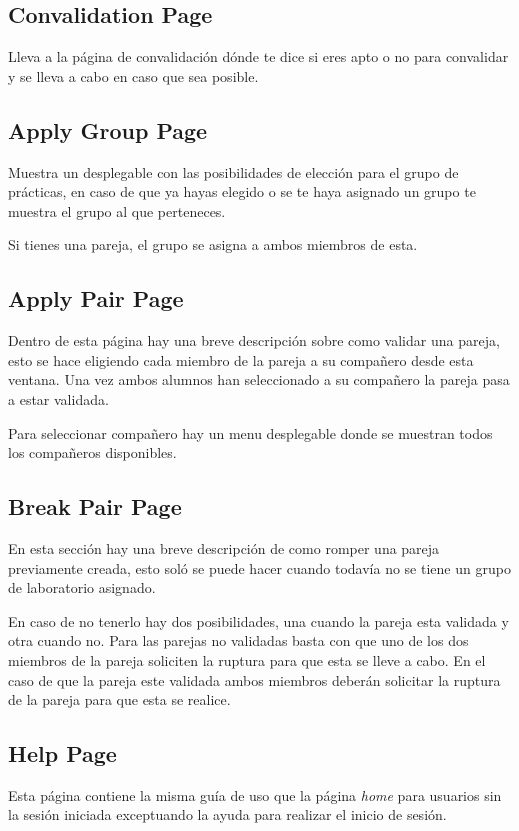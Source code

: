 \documentclass{article}
\begin{document}
\subsection*{Convalidation Page}

Lleva a la página de convalidación dónde te dice si eres apto o no para convalidar y se lleva a cabo en caso
que sea posible.


\subsection*{Apply Group Page}

Muestra un desplegable con las posibilidades de elección para el grupo de prácticas, en caso de que ya hayas
elegido o se te haya asignado un grupo te muestra el grupo al que perteneces.

Si tienes una pareja, el grupo se asigna a ambos miembros de esta.


\subsection*{Apply Pair Page}

Dentro de esta página hay una breve descripción sobre como validar una pareja, esto se hace eligiendo cada miembro
de la pareja a su compañero desde esta ventana. Una vez ambos alumnos han seleccionado a su compañero la pareja pasa 
a estar validada.

Para seleccionar compañero hay un menu desplegable donde se muestran todos los compañeros disponibles.


\subsection*{Break Pair Page}

En esta sección hay una breve descripción de como romper una pareja previamente creada, esto soló se puede
hacer cuando todavía no se tiene un grupo de laboratorio asignado.

En caso de no tenerlo hay dos posibilidades, una cuando la pareja esta validada y otra cuando no. Para las parejas
no validadas basta con que uno de los dos miembros de la pareja soliciten la ruptura para que esta se
lleve a cabo. En el caso de que la pareja este validada ambos miembros deberán solicitar la ruptura de la pareja para
que esta se realice.


\subsection*{Help Page}

Esta página contiene la misma guía de uso que la página \textit{home} para usuarios sin la sesión iniciada exceptuando 
la ayuda para realizar el inicio de sesión.
\end{document}

